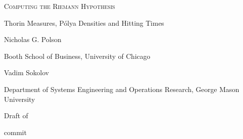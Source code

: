 \documentclass[11pt,twoside,openright]{book}
\makeatletter
\theoremstyle{sc}
\theoremstyle{scr}
\numberwithin{equation}{section}
\renewcommand{\cleardoublepage}{\clearpage\ifodd\c@page\else\hbox{}\thispagestyle{empty}\newpage\fi}
\makeatother
\begin{document}
\cleardoublepage
\else
\begin{titlepage}
\centering
\vspace*{3cm}
{\Huge\scshape Computing the Riemann Hypothesis\par}
\vspace{0.8cm}
{\Large Thorin Measures, P\'olya Densities and Hitting Times\par}
\vspace{2.5cm}
{\large Nicholas G. Polson\par}
{\small Booth School of Business, University of Chicago\par}
\vspace{0.6cm}
{\large Vadim Sokolov\par}
{\small Department of Systems Engineering and Operations Research, George Mason University\par}
\vfill
{\large Draft of \bookbuilddate\par}
\vspace{0.3cm}
{\normalsize commit \texttt{\bookcommit}\par}
\end{titlepage}
\fi

\tableofcontents
\listoffigures
\listoftables
\mainmatter




















































































\end{document}
